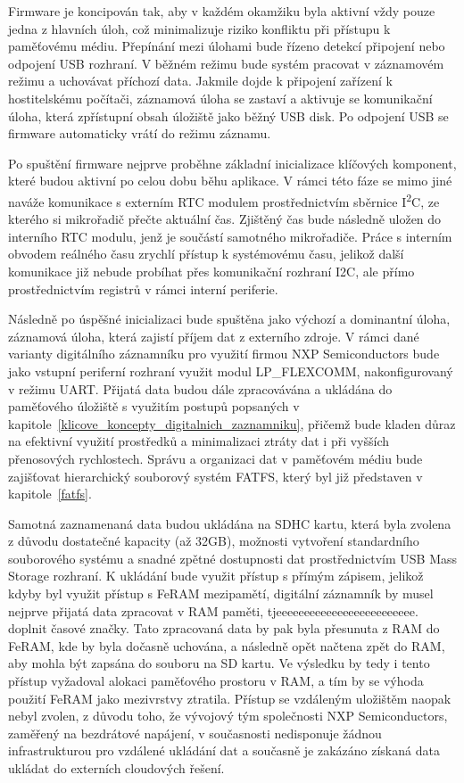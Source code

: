 Firmware je koncipován tak, aby v každém okamžiku byla aktivní vždy pouze jedna z hlavních úloh, což minimalizuje riziko konfliktu při přístupu k paměťovému médiu. Přepínání mezi úlohami bude řízeno detekcí připojení nebo odpojení USB rozhraní. V běžném režimu bude systém pracovat v záznamovém režimu a uchovávat příchozí data. Jakmile dojde k připojení zařízení k hostitelskému počítači, záznamová úloha se zastaví a aktivuje se komunikační úloha, která zpřístupní obsah úložiště jako běžný USB disk. Po odpojení USB se firmware automaticky vrátí do režimu záznamu.

Po spuštění firmware nejprve proběhne základní inicializace klíčových komponent, které budou aktivní po celou dobu běhu aplikace. V rámci této fáze se mimo jiné naváže komunikace s externím RTC modulem prostřednictvím sběrnice I\textsuperscript{2}C, ze kterého si mikrořadič přečte aktuální čas. Zjištěný čas bude následně uložen do interního RTC modulu, jenž je součástí samotného mikrořadiče. Práce s interním obvodem reálného času zrychlí přístup k systémovému času, jelikož další komunikace již nebude probíhat přes komunikační rozhraní I2C, ale přímo prostřednictvím registrů v rámci interní periferie.

Následně po úspěšné inicializaci bude spuštěna jako výchozí a dominantní úloha, záznamová úloha, která zajistí příjem dat z externího zdroje. V rámci dané varianty digitálního záznamníku pro využití firmou NXP Semiconductors bude jako vstupní periferní rozhraní využit modul LP\_FLEXCOMM, nakonfigurovaný v režimu UART. Přijatá data budou dále zpracovávána a ukládána do paměťového úložiště s využitím postupů popsaných v kapitole~\ref{klicove_koncepty_digitalnich_zaznamniku}, přičemž bude kladen důraz na efektivní využití prostředků a minimalizaci ztráty dat i při vyšších přenosových rychlostech. Správu a organizaci dat v paměťovém médiu bude zajišťovat hierarchický souborový systém FATFS, který byl již představen v kapitole~\ref{fatfs}.

Samotná zaznamenaná data budou ukládána na SDHC kartu, která byla zvolena z důvodu dostatečné kapacity (až 32GB), možnosti vytvoření standardního souborového systému a snadné zpětné dostupnosti dat prostřednictvím USB Mass Storage rozhraní. K ukládání bude využit přístup s přímým zápisem, jelikož kdyby byl využit přístup s FeRAM mezipamětí, digitální záznamník by musel nejprve přijatá data zpracovat v RAM paměti, tjeeeeeeeeeeeeeeeeeeeeeeeee. doplnit časové značky. Tato zpracovaná data by pak byla přesunuta z RAM do FeRAM, kde by byla dočasně uchována, a následně opět načtena zpět do RAM, aby mohla být zapsána do souboru na SD kartu. Ve výsledku by tedy i tento přístup vyžadoval alokaci paměťového prostoru v RAM, a tím by se výhoda použití FeRAM jako mezivrstvy ztratila. Přístup se vzdáleným uložištěm naopak nebyl zvolen, z důvodu toho, že vývojový tým společnosti NXP Semiconductors, zaměřený na bezdrátové napájení, v současnosti nedisponuje žádnou infrastrukturou pro vzdálené ukládání dat a současně je zakázáno získaná data ukládat do externích cloudových řešení.

